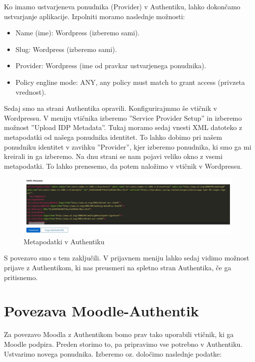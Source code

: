 \documentclass[a4paper,12pt,openright]{book}
\begin{document}
Ko imamo ustvarjeneva ponudnika (Provider) v Authentiku, lahko dokončamo ustvarjanje aplikacije. Izpolniti moramo naslednje možnosti:
\begin{itemize}
    \item Name (ime): Wordpress (izberemo sami).
    \item Slug: Wordpress (izberemo sami).
    \item Provider: Wordpress (ime od pravkar ustvarjenega ponudnika).
    \item Policy engline mode: ANY, any policy must match to grant access (privzeta vrednost). 
\end{itemize}

Sedaj smo na strani Authentika opravili. Konfigurirajmmo še vtičnik v Wordpressu. V meniju vtičnika izberemo ''Service Provider Setup'' in izberemo možnost ''Upload IDP Metadata''. Tukaj moramo sedaj vnesti XML datoteko z metapodatki od našega ponudnika identitet. To lahko dobimo pri našem ponudniku identitet v zavihku ''Provider'', kjer izberemo ponudnika, ki smo ga mi kreirali in ga izberemo. Na dnu strani se nam pojavi veliko okno z vsemi metapodatki. To lahko prenesemo, da potem naložimo v vtičnik v Wordpressu. 

\begin{figure}[H]
\hspace{-4cm}
\includegraphics[scale=0.5]{diploma-FRI-vzorec_11maj2021/SAMLMetadata.jpg}
\caption{Metapodatki v Authentiku}
\label{fig}
\end{figure}

S povezavo smo s tem zaključili. V prijavnem meniju lahko sedaj vidimo možnost prijave z Authentikom, ki nas preusmeri na spletno stran Authentika, če ga pritisnemo. 

\section{Povezava Moodle-Authentik}

Za povezavo Moodla z Authentikom bomo prav tako uporabili vtičnik, ki ga Moodle podpira. Preden storimo to, pa pripravimo vse potrebno v Authentiku. Ustvarimo novega ponudnika. Izberemo oz. določimo naslednje podatke:
\end{document}
